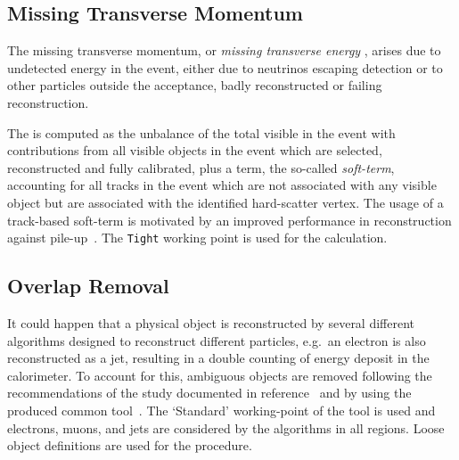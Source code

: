 \subsection{Missing Transverse Momentum}%
\label{sec:definitions-met}

The missing transverse momentum, or \textit{missing transverse energy} \MET,
arises due to undetected energy in the event, either due to neutrinos escaping
detection or to other particles outside the acceptance, badly reconstructed
or failing reconstruction.

The \MET is computed as the unbalance of the total visible \pt in the event with
contributions from all visible objects in the event which are selected,
reconstructed and fully calibrated, plus a term, the so-called
\textit{soft-term}, accounting for all tracks in the event which are not
associated with any visible object but are associated with the identified
hard-scatter vertex. The usage of a track-based soft-term is motivated by an
improved performance in \MET reconstruction against pile-up~\cite{JETM-2020-03}.
The \texttt{Tight} working point is used for the \MET calculation.


\subsection{Overlap Removal}%
\label{sec:definitions-overlap-removal}


It could happen that a physical object is reconstructed by several different
algorithms designed to reconstruct different particles, e.g.\ an electron is
also reconstructed as a jet, resulting in a double counting of energy deposit in
the calorimeter. To account for this, ambiguous objects are removed following
the recommendations of the study documented in reference~\cite{Adams:1700874}
and by using the produced common tool~\cite{web:OverlapRemoval}.
The `Standard' working-point of the tool is used and electrons, muons, and jets
are considered by the algorithms in all regions.
Loose object definitions are used for the procedure.

